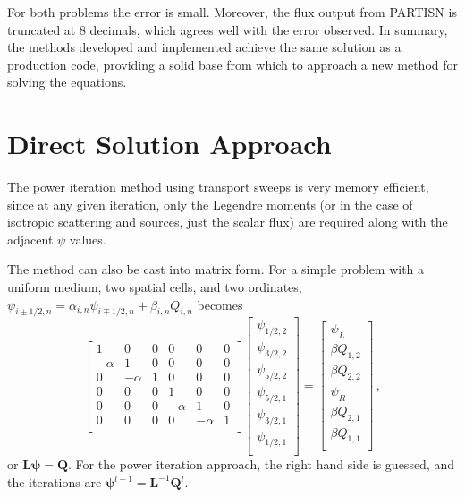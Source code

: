 \documentclass[final,3p,times,11pt]{elsarticle}
\begin{document}
  For both problems the error is small.  Moreover, the flux output from PARTISN is truncated at 8 decimals, which agrees well with the error observed.  In summary, the methods developed and implemented achieve the same solution as a production code, providing a solid base from which to approach a new method for solving the equations.

\section{Direct Solution Approach}
     The power iteration method using transport sweeps is very memory efficient, since at any given iteration, only the Legendre moments (or in the case of isotropic scattering and sources, just the scalar flux) are required along with the adjacent $\psi$ values. 

     The method can also be cast into matrix form.  For a simple problem with a uniform medium, two spatial cells, and two ordinates, $\psi_{i\pm1/2,n} = \alpha_{i,n} \psi_{i\mp1/2,n} + \beta_{i,n} Q_{i,n}$ becomes
	\begin{equation}
	\left
	[\begin{array}{cccccc}
	      1    &    0      &    0    &    0      &    0     &    0    \\
	  -\alpha  &    1      &    0    &    0      &    0     &    0    \\
	      0    &  -\alpha  &    1    &    0      &    0     &    0    \\
	      0    &    0      &    0    &    1      &    0     &    0    \\
	      0    &    0      &    0    & -\alpha   &    1     &    0    \\
	      0    &    0      &    0    &    0      &  -\alpha &    1    \\
	\end{array} 
	\right ] 
	\left
	[\begin{array}{c}
	  \psi_{1/2,2}     \\
	  \psi_{3/2,2}     \\
	  \psi_{5/2,2}     \\
	  \psi_{5/2,1}     \\
	  \psi_{3/2,1}     \\
	  \psi_{1/2,1}     \\
	\end{array} 
	\right ] =
	\left
	[\begin{array}{c}
	  \psi_{L}       \\
	  \beta Q_{1,2}  \\
	  \beta Q_{2,2}  \\
	  \psi_{R}       \\
	  \beta Q_{2,1}  \\
	  \beta Q_{1,1}  \\
	\end{array} 
	\right ] \, ,
	\end{equation}
  or $\bm{L\psi} = \bm{Q}$.  For the power iteration approach, the right hand side is guessed, and the iterations are $\bm{\psi}^{l+1}=\bm{L}^{-1}\bm{Q}^l$.
\end{document}

